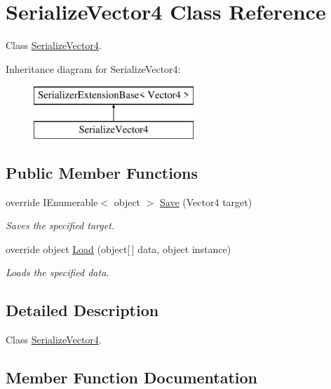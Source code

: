 \hypertarget{class_serialize_vector4}{}\section{Serialize\+Vector4 Class Reference}
\label{class_serialize_vector4}


Class \hyperlink{class_serialize_vector4}{Serialize\+Vector4}.  


Inheritance diagram for Serialize\+Vector4\+:\begin{figure}[H]
\begin{center}
\leavevmode
\includegraphics[height=2.000000cm]{class_serialize_vector4}
\end{center}
\end{figure}
\subsection*{Public Member Functions}
\begin{DoxyCompactItemize}
\item 
override I\+Enumerable$<$ object $>$ \hyperlink{class_serialize_vector4_a89b8effbb37fc428b4cc27a646eafe55}{Save} (Vector4 target)
\begin{DoxyCompactList}\small\item\em Saves the specified target. \end{DoxyCompactList}\item 
override object \hyperlink{class_serialize_vector4_a27f598468775a1c9f882b7ab378274cd}{Load} (object\mbox{[}$\,$\mbox{]} data, object instance)
\begin{DoxyCompactList}\small\item\em Loads the specified data. \end{DoxyCompactList}\end{DoxyCompactItemize}


\subsection{Detailed Description}
Class \hyperlink{class_serialize_vector4}{Serialize\+Vector4}. 



\subsection{Member Function Documentation}
\mbox{\label{class_serialize_vector4_a27f598468775a1c9f882b7ab378274cd}} 
